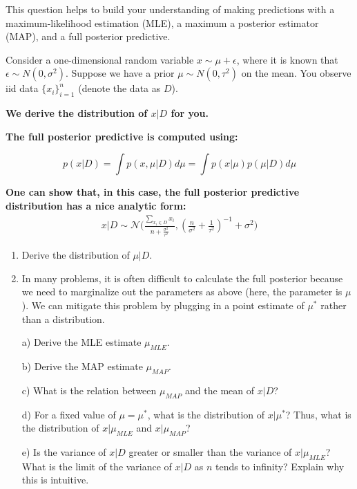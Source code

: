 \documentclass[submit]{harvardml}
\begin{document}
\begin{problem}

  This question helps to build your understanding of making
  predictions with a maximum-likelihood estimation (MLE), a maximum a
  posterior estimator (MAP), and a full posterior predictive.

  Consider a one-dimensional random variable $x \sim \mu + \epsilon$,
  where it is known that $\epsilon \sim N(0,\sigma^2)$.  Suppose we
  have a prior $\mu \sim N(0,\tau^2)$ on the mean. You observe iid data $\{x_i\}_{i=1}^n$ (denote the data as $D$).


\textbf{We derive the distribution of $x|D$ for you.}

\textbf{The full posterior predictive is computed using:}

$$p(x|D)=\int p(x, \mu|D) d\mu =\int p(x|\mu)p(\mu|D) d\mu $$


\textbf{One can show that, in this case, the full posterior predictive distribution has a nice analytic
  form:}
   \begin{align}
        x|D \sim \mathcal{N}\Bigg(\frac{\sum_{x_i\in D}x_i}{n+\frac{\sigma^2}{\tau^2}}, (\frac{n}{\sigma^2}+\frac{1}{\tau^2})^{-1} + \sigma^2\Bigg)
     \end{align}

\begin{enumerate}

  \item Derive the distribution of $\mu|D$.

  \item 
  In many problems, it is often difficult to
  calculate the full posterior because we need to marginalize out the parameters as above (here,
  the parameter is $\mu$). We can mitigate this problem by plugging in
  a point estimate of $\mu^*$ rather than a distribution.

  a) Derive the MLE
  estimate $\mu_{MLE}$.
  
  b) Derive the MAP estimate $\mu_{MAP}$. %

  c) What is the relation between $\mu_{MAP}$ and the mean of $x|D$?

  d) For a fixed value of $\mu=\mu^*$, what is the distribution of $x|\mu^*$? Thus, what is the distribution of $x|\mu_{MLE}$ and $x|\mu_{MAP}$?

  e) Is the variance of $x|D$ greater or smaller than the variance of $x|\mu_{MLE}$? What is the limit of the variance of $x|D$ as $n$ tends to infinity? Explain why this is intuitive.



\end{enumerate}
\end{problem}
\end{document}
